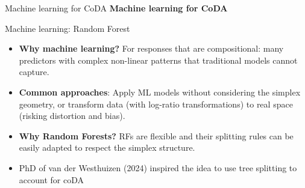 \begin{frame}{Machine learning for CoDA}
      \centering
      \vfill
      \textbf{\Large Machine learning for CoDA}
      \vfill
\end{frame}







\begin{frame}{Machine learning: Random Forest}

\begin{itemize}

\item \textbf{Why machine learning?}  
For responses that are compositional: many predictors with complex non-linear patterns that traditional models cannot capture.

\item \textbf{Common approaches}:  
Apply ML models without considering the simplex geometry, or transform data (with log-ratio transformations) to real space (risking distortion and bias).

\item \textbf{Why Random Forests?}  
RFs are flexible and their splitting rules can be easily adapted to respect the simplex structure.

\item PhD of van der Westhuizen (2024) inspired the idea to use tree splitting to account for coDA
\end{itemize}

    
\end{frame}



